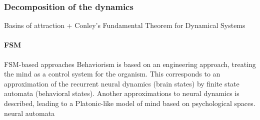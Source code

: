 \documentclass{article}
\theoremstyle{definition} \newtheorem{definition}{Definition}  \newtheorem{example}{Example}
\theoremstyle{remark} \newtheorem{remark}{Remark}
\newcounter{ct}
\begin{document}

\subsubsection{Decomposition of the dynamics}\label{sec:decomposition}
Basins of attraction + Conley’s Fundamental Theorem for Dynamical Systems \citep{conley1978morse, norton1995fundamental,mischaikow1999cit}

\paragraph{FSM} FSM-based approaches\citep{pollack1991induction, casey1996dynamics, jacobsson2005ruleextraction, ashwin2021excitable, oliva2019fsm, cotteret2024fsm}
Behaviorism is based on an engineering approach, treating the mind as a control system for the organism.
This corresponds to an approximation of the recurrent neural dynamics (brain states) by finite state automata (behavioral states).
Another approximations to neural dynamics is described, leading to a Platonic-like model of mind based on psychological spaces. \citep{duch1998platonic}
%
neural automata\citep{goles2013neural, uria2024invariants}
\end{document}
